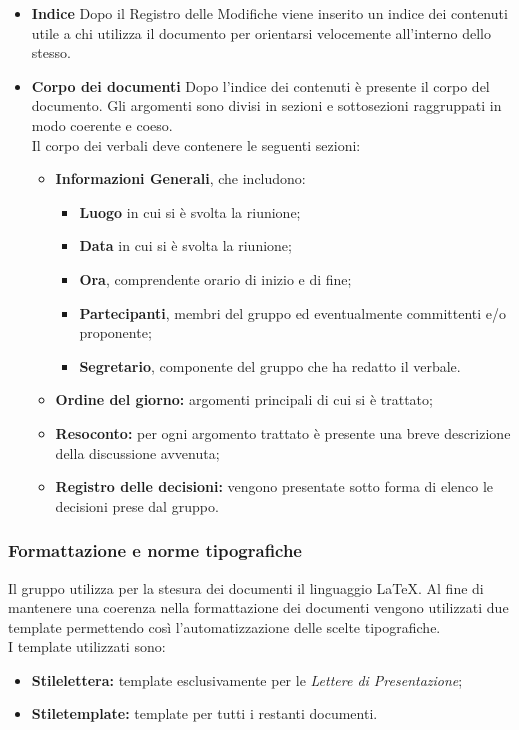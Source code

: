 \begin{itemize}
\item\textbf{Indice}
Dopo il Registro delle Modifiche viene inserito un indice dei contenuti utile a chi utilizza il documento per orientarsi velocemente all'interno dello stesso.

\item\textbf{Corpo dei documenti}
Dopo l'indice dei contenuti è presente il corpo del documento. Gli argomenti sono divisi in sezioni e sottosezioni raggruppati in modo coerente e coeso.\\
Il corpo dei verbali deve contenere le seguenti sezioni:
\begin{itemize}
	\item \textbf{Informazioni Generali}, che includono:
		\begin{itemize}
			\item \textbf{Luogo} in cui si è svolta la riunione;
			\item \textbf{Data} in cui si è svolta la riunione;
			\item \textbf{Ora}, comprendente orario di inizio e di fine;
			\item \textbf{Partecipanti}, membri del gruppo ed eventualmente committenti e/o proponente;
			\item \textbf{Segretario}, componente del gruppo che ha redatto il verbale.
		\end{itemize}
	\item \textbf{Ordine del giorno:} argomenti principali di cui si è trattato;
	\item \textbf{Resoconto:} per ogni argomento trattato è presente una breve descrizione della discussione avvenuta;
	\item \textbf{Registro delle decisioni:} vengono presentate sotto forma di elenco le decisioni prese dal gruppo.
\end{itemize}
\end{itemize}

\subsubsection{Formattazione e norme tipografiche}
Il gruppo utilizza per la stesura dei documenti il linguaggio \LaTeX. Al fine di mantenere una coerenza nella formattazione dei documenti vengono utilizzati due template permettendo così l'automatizzazione delle scelte tipografiche.\\
I template utilizzati sono:
\begin{itemize}
	\item \textbf{Stilelettera:} template esclusivamente per le \textit{Lettere di Presentazione};
	\item \textbf{Stiletemplate:} template per tutti i restanti documenti.
\end{itemize}

